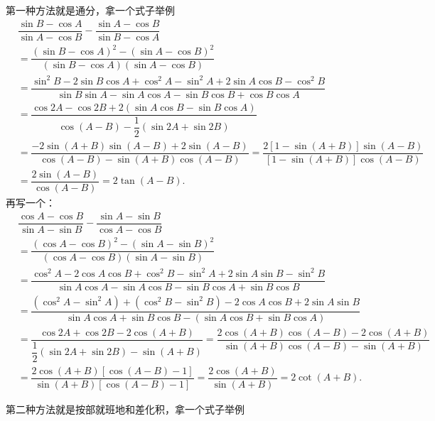\begin{solution}
第一种方法就是通分，拿一个式子举例
\begin{align*}
&\dfrac{\sin B - \cos A}{\sin A - \cos B} - \dfrac{\sin A - \cos B}{\sin B - \cos A}\\[1.2ex]
&=\dfrac{(\sin B - \cos A)^2 - (\sin A - \cos B)^2}{(\sin B - \cos A)\left(\sin A - \cos B\right)}\\[1.2ex]
&=\dfrac{\sin^2 B - 2\sin B \cos A + \cos^2 A - \sin^2 A + 2\sin A \cos B - \cos^2 B}{\sin B \sin A - \sin A \cos A - \sin B \cos B + \cos B \cos A}\\[1.2ex]
&=\dfrac{\cos 2A - \cos 2B + 2\left(\sin A \cos B - \sin B \cos A\right)}{\cos\left(A - B\right) - \dfrac{1}{2}\left(\sin 2A + \sin 2B\right)}\\[1.2ex]
&=\dfrac{-2\sin\left(A + B\right)\sin\left(A - B\right) + 2\sin\left(A - B\right)}{\cos\left(A - B\right) - \sin\left(A + B\right)\cos\left(A - B\right)}
=\dfrac{2\left[1 - \sin\left(A + B\right)\right]\sin\left(A - B\right)}{\left[1 - \sin\left(A + B\right)\right]\cos\left(A - B\right)}
\\[1.2ex]&=\dfrac{2\sin\left(A - B\right)}{\cos\left(A - B\right)} = 2\tan\left(A - B\right).
\end{align*}
再写一个：
\begin{align*}
&\dfrac{\cos A - \cos B}{\sin A - \sin B} - \dfrac{\sin A - \sin B}{\cos A - \cos B}\\[1.2ex]
&=\dfrac{(\cos A - \cos B)^2 - (\sin A - \sin B)^2}{(\cos A - \cos B)(\sin A - \sin B)}\\[1.2ex]
&=\dfrac{\cos^2 A - 2\cos A\cos B + \cos^2 B - \sin^2 A + 2\sin A\sin B - \sin^2 B}{\sin A\cos A - \sin A\cos B - \sin B\cos A + \sin B\cos B}\\[1.2ex]
&=\dfrac{(\cos^2 A - \sin^2 A) + (\cos^2 B - \sin^2 B) - 2\cos A\cos B + 2\sin A\sin B}{\sin A\cos A + \sin B\cos B - (\sin A\cos B + \sin B\cos A)}\\[1.2ex]
&=\dfrac{\cos 2A + \cos 2B - 2\cos(A + B)}{\dfrac{1}{2}(\sin 2A + \sin 2B) - \sin(A + B)}
=\dfrac{2\cos(A + B)\cos(A - B) - 2\cos(A + B)}{\sin(A + B)\cos(A - B) - \sin(A + B)}\\[1.2ex]
&=\dfrac{2\cos(A + B)[\cos(A - B) - 1]}{\sin(A + B)[\cos(A - B) - 1]}
=\dfrac{2\cos(A + B)}{\sin(A + B)} = 2\cot(A + B).
\end{align*}
\end{solution}
第二种方法就是按部就班地和差化积，拿一个式子举例
